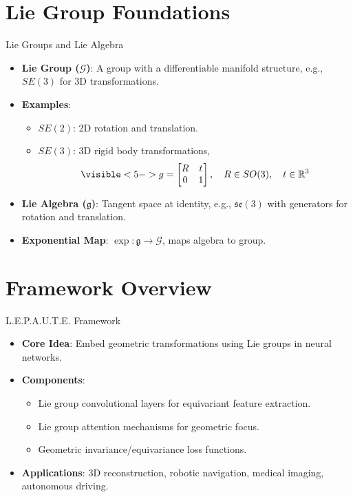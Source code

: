 \documentclass{beamer}
\begin{document}
\section{Lie Group Foundations}
\begin{frame}{Lie Groups and Lie Algebra}
  \begin{itemize}
    \item<1-> \textbf{Lie Group ($\mathcal{G}$)}: A group with a differentiable manifold structure, e.g., $SE(3)$ for 3D transformations.
    \item<2-> \textbf{Examples}:
      \begin{itemize}
        \item<3-> $SE(2)$: 2D rotation and translation.
        \item<4-> $SE(3)$: 3D rigid body transformations, 
          \[
          \visible<5->{g = \begin{bmatrix} R & t \\ 0 & 1 \end{bmatrix}, \quad R \in SO(3), \quad t \in \mathbb{R}^3}
          \]
      \end{itemize}
    \item<6-> \textbf{Lie Algebra ($\mathfrak{g}$)}: Tangent space at identity, e.g., $\mathfrak{se}(3)$ with generators for rotation and translation.
    \item<7-> \textbf{Exponential Map}: $\exp: \mathfrak{g} \to \mathcal{G}$, maps algebra to group.
  \end{itemize}
\end{frame}

\section{Framework Overview}
\begin{frame}{L.E.P.A.U.T.E. Framework}
  \begin{itemize}
    \item<1-> \textbf{Core Idea}: Embed geometric transformations using Lie groups in neural networks.
    \item<2-> \textbf{Components}:
      \begin{itemize}
        \item<3-> Lie group convolutional layers for equivariant feature extraction.
        \item<4-> Lie group attention mechanisms for geometric focus.
        \item<5-> Geometric invariance/equivariance loss functions.
      \end{itemize}
    \item<6-> \textbf{Applications}: 3D reconstruction, robotic navigation, medical imaging, autonomous driving.
  \end{itemize}
  \begin{center}
  \end{center}
\end{frame}
\end{document}

